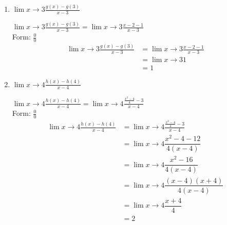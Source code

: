 \documentclass{ximera}
\begin{document}
\begin{problem}
\begin{enumerate}
\begin{explanation}
			$\displaystyle \lim{x \to 2}\frac{h(x)}{g(x)}=\displaystyle \lim{x \to 2}\frac{\frac{x^2-4}{4}}{x-2}$\\
		Form: $\frac{{0}}{0}$ \\
		\begin{align*}
		\displaystyle \lim{x \to 2}\frac{\frac{x^2-4}{4}}{x-2}&=\displaystyle \lim{x \to 2}\frac{(x-2)(x+2)}{4(x-2)}\\
		&= \displaystyle \lim{x \to 2} \frac{x+2}{4}\\
		&= \frac{4}{4}\\
		&= 1
		\end{align*}
		\end{explanation}	
\item $\displaystyle \lim{x \to 3}\frac{g(x)-g(3)}{x-3}$
\begin{explanation}
			$\displaystyle \lim{x \to 3}\frac{g(x)-g(3)}{x-3}=\displaystyle \lim{x \to 3}\frac{x-2-1}{x-3}$\\
		Form: $\frac{{0}}{0}$ \\
		\begin{align*}
		\displaystyle \lim{x \to 3}\frac{g(x)-g(3)}{x-3}&=\displaystyle \lim{x \to 3}\frac{x-2-1}{x-3}\\
		&=\displaystyle \lim{x \to 3}1\\	
		&=1		
		\end{align*}
		\end{explanation}	
\item  $\displaystyle \lim{x \to4}\frac{h(x)-h(4)}{x-4}$
\begin{explanation}
			$\displaystyle \lim{x \to 4}\frac{h(x)-h(4)}{x-4}=\displaystyle \lim{x \to 4}\frac{\frac{x^2-4}{4}-3}{x-4}$\\
		Form: $\frac{{0}}{0}$ \\
		\begin{align*}
		\displaystyle \lim{x \to 4}\frac{h(x)-h(4)}{x-4}&=\displaystyle \lim{x \to 4}\frac{\frac{x^2-4}{4}-3}{x-4}\\
		&=\displaystyle \lim{x \to 4}\dfrac{x^2-4-12}{4(x-4)}\\	
		&=\displaystyle \lim{x \to 4}\dfrac{x^2-16}{4(x-4)}\\
		&=\displaystyle \lim{x \to 4}\dfrac{(x-4)(x+4)}{4(x-4)}\\
		&=\displaystyle \lim{x \to 4}\dfrac{x+4}{4}\\	
		&=2		
		\end{align*}
		\end{explanation}	
\end{enumerate}
\end{problem}
\end{document}
